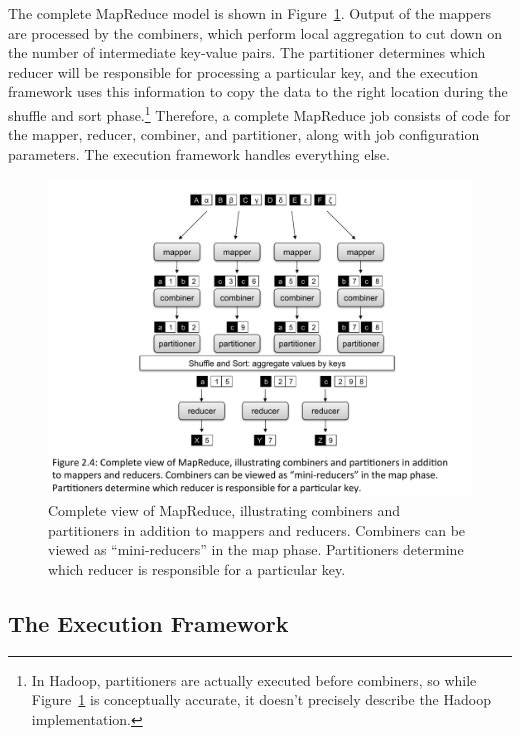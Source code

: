 \documentclass[11pt]{article}
\begin{document}
The complete MapReduce model is shown in
Figure~\ref{figure:chapter2:MapReduce-complete}.  Output of the
mappers are processed by the combiners, which perform local
aggregation to cut down on the number of intermediate key-value pairs.
The partitioner determines which reducer will be responsible for
processing a particular key, and the execution framework uses this
information to copy the data to the right location during the shuffle
and sort phase.\footnote{In Hadoop, partitioners are actually executed
before combiners, so while
Figure~\ref{figure:chapter2:MapReduce-complete} is conceptually
accurate, it doesn't precisely describe the Hadoop implementation.}
Therefore, a complete MapReduce job consists of code for the mapper,
reducer, combiner, and partitioner, along with job configuration
parameters.  The execution framework handles everything else.

\begin{figure}[t]
\begin{center}
\includegraphics[scale=0.6]{figures/fig-ch2-MapReduce-complete.pdf}
\end{center}
\caption{Complete view of MapReduce, illustrating combiners and
  partitioners in addition to mappers and reducers.  Combiners can be
  viewed as ``mini-reducers'' in the map phase.  Partitioners
  determine which reducer is responsible for a particular key.}
\label{figure:chapter2:MapReduce-complete}
\end{figure}

\subsection{The Execution Framework}
\label{chapter2:execution-framework}
\end{document}
